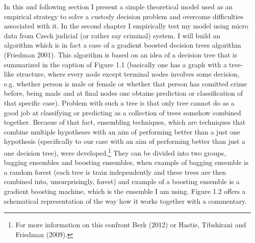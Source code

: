 \documentclass[12pt, twoside]{book} %
\begin{document}
In this and following section I present a simple theoretical model used as an empirical strategy to solve a custody decision problem and overcome difficulties associated with it. In the second chapter I empirically test my model using micro data from Czech judicial (or rather say criminal) system. I will build an algorithm which is in fact a case of a gradient boosted decision trees algorithm (Friedman 2001). This algorithm is based on an idea of a decision tree that is summarized in the caption of Figure 1.1 (basically one has a graph with a tree-like structure, where every node except terminal nodes involves  some decision, e.g. whether person is male or female or whether that person has comitted crime before, being made and at final nodes one obtains prediction or classification of that specific case).\newline
Problem with such a tree is that only tree cannot do as a good job at classifying or predicting as a collection of trees somehow combined together. Becasue of that fact, ensembling techniques, which are techniques that combine multiple hypotheses with an aim of performing better than a just one hypothesis (specifically to our case with an aim of performing better than just a one decision tree), were developed.\footnote{For more information on this confront Berk (2012) or Hastie, Tibshirani and Friedman (2009).} They can be divided into two groups, bagging ensembles and boosting ensembles, when example of bagging ensemble is a random forest (each tree is train independently and these trees are then combined into, unsurprisingly, forest) and example of a boosting ensemble is a gradient boosting machine, which is the ensemble I am using. Figure 1.2 offers a schematical representation of the way how it works together with a commentary. \newline
\end{document}

